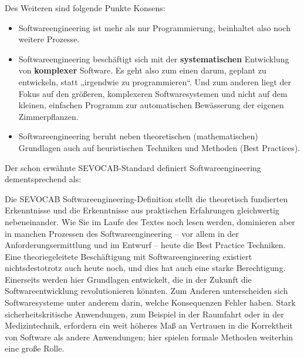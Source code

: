 Des Weiteren sind folgende Punkte Konsens: 
\begin{itemize}
	\item Softwareengineering ist mehr als nur Programmierung, beinhaltet also noch weitere Prozesse.
	\item Softwareengineering beschäftigt sich mit der \textbf{systematischen} Entwicklung von \textbf{komplexer} Software. Es geht also zum einen darum, geplant zu entwickeln, statt „irgendwie zu programmieren“. Und zum anderen liegt der Fokus auf den größeren, komplexeren Softwaresystemen und nicht auf dem kleinen, einfachen Programm zur automatischen Bewässerung der eigenen Zimmerpflanzen.
	\item Softwareengineering beruht neben theoretischen (mathematischen) Grund\-lagen auch auf heuristischen Techniken und Methoden (Best Practices).
\end{itemize}

\pagebreak %

Der schon erwähnte SEVOCAB-Standard definiert Softwareengineering dementsprechend als: 


\vspace{\baselineskip} %

Die SEVOCAB Softwareengineering-Definition stellt die theoretisch fundierten Erkenntnisse und die Erkenntnisse aus praktischen Erfahrungen gleichwertig neben\-einander. Wie Sie im Laufe des Textes noch lesen werden, dominieren aber in manchen Prozessen des Softwareengineering – vor allem in der Anforderungsermittlung und im Entwurf – heute die Best Practice Techniken. Eine theoriegeleitete Beschäftigung mit Softwareengineering existiert nichtsdestotrotz auch heute noch, und dies hat auch eine starke Berechtigung. Einerseits werden hier Grundlagen entwickelt, die in der Zukunft die Softwareentwicklung revolutionieren könnten. Zum Anderen unterscheiden sich Softwaresysteme unter anderem darin, welche Konsequenzen Fehler haben. Stark sicherheitskritische Anwendungen, zum Beispiel in der Raumfahrt oder in der Medizintechnik, erfordern ein weit höheres Maß an Vertrauen in die Korrektheit von Software als andere Anwendungen; hier spielen formale Methoden weiterhin eine große Rolle.

